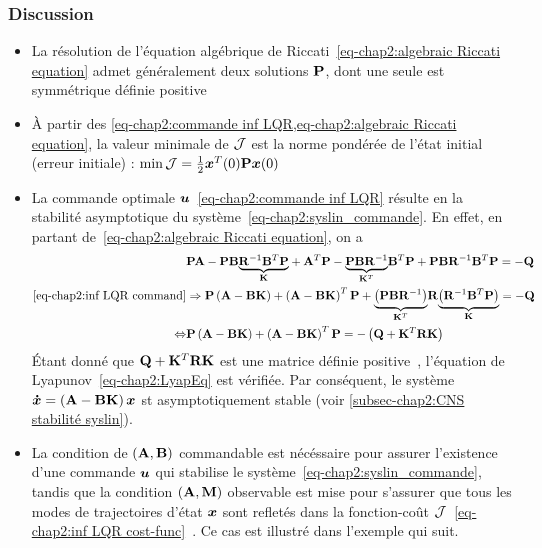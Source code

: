 \subsubsection{Discussion}
\begin{itemize}
	\item La résolution  de l'équation algébrique de Riccati~\eqref{eq-chap2:algebraic Riccati equation} admet généralement deux solutions $\mathbf{P}$, dont une seule est symmétrique définie positive
	\item À partir des \cref{eq-chap2:commande inf LQR,eq-chap2:algebraic Riccati equation}, la valeur minimale de ${\cal J}$ est la norme pondérée de l'état initial (erreur initiale) : $\min {\cal J} = \frac{1}{2}\bm{x}^T(0)\mathbf{P}\bm{x}(0)$
	\item La commande optimale $\bm{u}$~\eqref{eq-chap2:commande inf LQR} résulte en la stabilité asymptotique du système~\eqref{eq-chap2:syslin_commande}. En effet, en partant de~\eqref{eq-chap2:algebraic Riccati equation}, on a
	\begin{align}
		\begin{split}
			&\mathbf{P}\mathbf{A}-\mathbf{P}\mathbf{B}\underset{\mathbf{K}}{\underbrace{\mathbf{R}^{-1}\mathbf{B}^T\mathbf{P}}}+\mathbf{A}^T\mathbf{P}-\underset{\mathbf{K}^T}{\underbrace{\mathbf{P}\mathbf{B}\mathbf{R}^{-1}}}\mathbf{B}^T\mathbf{P}+\mathbf{P}\mathbf{B}\mathbf{R}^{-1}\mathbf{B}^T\mathbf{P}=-\mathbf{Q} \\
			\eqref{eq-chap2:inf LQR command}&\Rightarrow\mathbf{P}\left(\mathbf{A}-\mathbf{B}\mathbf{K}\right) + \left(\mathbf{A}-\mathbf{B}\mathbf{K}\right)^T\mathbf{P}+\underset{\mathbf{K}^T}{\underbrace{\left(\mathbf{P}\mathbf{B}\mathbf{R}^{-1}\right)}}\mathbf{R}\underset{\mathbf{K}}{\underbrace{\left(\mathbf{R}^{-1}\mathbf{B}^T\mathbf{P}\right)}} = -\mathbf{Q} \\
			\Leftrightarrow&\mathbf{P}\left(\mathbf{A}-\mathbf{B}\mathbf{K}\right) + \left(\mathbf{A}-\mathbf{B}\mathbf{K}\right)^T\mathbf{P} = -\left(\mathbf{Q}+\mathbf{K}^T\mathbf{R}\mathbf{K}\right)
		\end{split}
	\end{align}
	Étant donné que $\mathbf{Q} + \mathbf{K}^T\mathbf{R}\mathbf{K}$ est une matrice définie positive~\cite[Théorème~4.2.1, pp. 160]{golub2013matrixComputations}, l'équation de Lyapunov~\eqref{eq-chap2:LyapEq} est vérifiée. Par conséquent, le système $\bm{\dot{x}}=\left(\mathbf{A}-\mathbf{B}\mathbf{K}\right)\bm{x}$ st asymptotiquement stable (voir \cref{subsec-chap2:CNS stabilité syslin}). 
	\item La condition de $(\mathbf{A},\mathbf{B})$ commandable est nécéssaire pour assurer l'existence d'une commande $\bm{u}$ qui stabilise le système~\eqref{eq-chap2:syslin_commande}, tandis que la condition $(\mathbf{A},\mathbf{M})$ observable est mise pour s'assurer que tous les modes de trajectoires d'état $\bm{x}$ sont refletés dans la fonction-coût ${\cal J}$~\eqref{eq-chap2:inf LQR cost-func}~\cite{brunton2019book}. Ce cas est illustré dans l'exemple qui suit.

\end{itemize}
